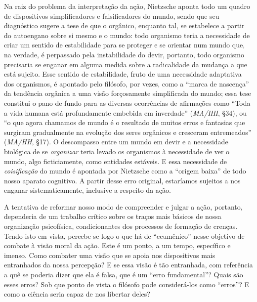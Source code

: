 \documentclass[
	12pt,				%
	openright,			%
	oneside,			%
	a4paper,			%
	english,			%
	french,				%
	spanish,			%
	brazil				%
	]{abntex2}
\begin{document}
Na raiz do problema da interpretação da ação, Nietzsche aponta todo um quadro de dispositivos simplificadores e falsificadores do mundo, sendo que seu diagnóstico sugere a tese de que o orgânico, enquanto tal, se estabelece a partir do autoengano sobre si mesmo e o mundo: todo organismo teria a necessidade de criar um sentido de estabilidade para se proteger e se orientar num mundo que, na verdade, é perpassado pela instabilidade do devir, portanto, todo organismo precisaria se enganar em alguma medida sobre a radicalidade da mudança a que está sujeito. Esse sentido de estabilidade, fruto de uma necessidade adaptativa dos organismos, é apontado pelo filósofo, por vezes, como a “marca de nascença” da tendência orgânica a uma visão forçosamente simplificada do mundo; essa tese constitui o pano de fundo para as diversas ocorrências de afirmações como “Toda a vida humana está profundamente embebida em inverdade” (\textit{MA/HH}, §34), ou “o que agora chamamos de mundo é o resultado de muitos erros e fantasias que surgiram gradualmente na evolução dos seres orgânicos e cresceram entremeados” (\textit{MA/HH}, §17). O descompasso entre um mundo em devir e a necessidade biológica de se \textit{organizar} teria levado os organismos à necessidade de ver o mundo, algo ficticiamente, como entidades estáveis. E essa necessidade de \textit{coisificação} do mundo é apontada por Nietzsche como a “origem baixa” de todo nosso aparato cognitivo. A partir desse erro original, estaríamos sujeitos a nos enganar sistematicamente, inclusive a respeito da ação. 

A tentativa de reformar nosso modo de compreender e julgar a ação, portanto, dependeria de um trabalho crítico sobre os traços mais básicos de nossa organização psicofísica, condicionantes dos processos de formação de crenças. Tendo isto em vista, percebe-se logo o que há de “ecumênico” nesse objetivo de combate à visão moral da ação. Este é um ponto, a um tempo, específico e imenso. Como combater uma visão que se apoia nos dispositivos mais entranhados da nossa percepção? E se essa visão é tão entranhada, com referência a quê se poderia dizer que ela é falsa, que é um “erro fundamental”? Quais são esses erros? Sob que ponto de vista o filósofo pode considerá-los como “erros”? E como a ciência seria capaz de nos libertar deles?
\end{document}
